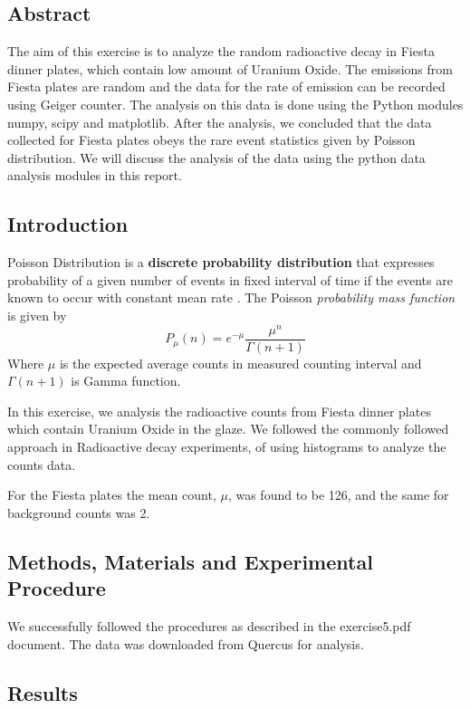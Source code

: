 \documentclass[letterpaper,12pt]{article}
\begin{document}
\subsection{Abstract}
The aim of this exercise is to analyze the random radioactive decay in Fiesta dinner plates, which 
contain low amount of Uranium Oxide. The emissions from Fiesta plates are random and the data for 
the rate of emission can be recorded using Geiger counter. The analysis on this data is done using
the Python modules numpy, scipy and matplotlib. After the analysis, we concluded that the data 
collected for Fiesta plates obeys the rare event statistics given by Poisson distribution. We will discuss
the analysis of the data using the python data analysis modules in this report.

\subsection{Introduction}

Poisson Distribution is a \textbf{discrete probability distribution} that expresses probability of a given number 
of events in fixed interval of time if the events are known to occur with constant mean rate \cite{lab-manual-ex5}.
The Poisson \emph{probability mass function} is given by
$$P_{\mu}(n) = e^{-\mu}\frac{\mu^n}{\Gamma(n+1)}$$
Where $\mu$ is the expected average counts in measured counting interval and $\Gamma(n+1)$ is Gamma function. 

In this exercise, we analysis the radioactive counts from Fiesta dinner plates which contain Uranium Oxide in the glaze.
We followed the commonly followed approach in Radioactive decay experiments, of using histograms to analyze the counts data.

For the Fiesta plates the mean count, $\mu$, was found to be 126, and the same for background counts was 2.

\subsection{Methods, Materials and Experimental Procedure}

We successfully followed the procedures as described in the exercise5.pdf \cite{lab-manual-ex5}
document. The data was downloaded from Quercus for analysis.

\subsection{Results}
\end{document}
